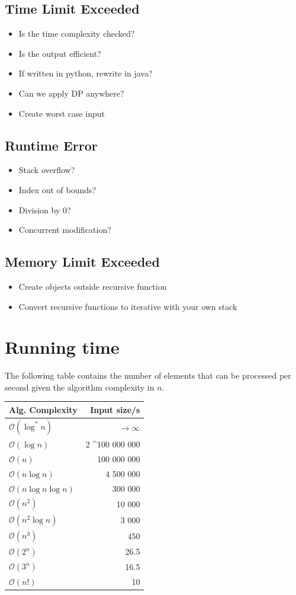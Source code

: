 \documentclass[8pt,a4paper,landscape,oneside]{amsart}
\newcommand{\bigO}{\mathcal{O}}
\begin{document}
\begin{multicols*}{3}
  \subsection{Time Limit Exceeded}
    \begin{itemize}
    \item Is the time complexity checked?
    \item Is the output efficient?
    \item If written in python, rewrite in java?
    \item Can we apply DP anywhere?
    \item Create worst case input
    \end{itemize}
  \subsection{Runtime Error}
    \begin{itemize}
    \item Stack overflow?
    \item Index out of bounds?
    \item Division by $0$?
    \item Concurrent modification?
    \end{itemize}
  \subsection{Memory Limit Exceeded}
    \begin{itemize}
    \item Create objects outside recursive function
    \item Convert recursive functions to iterative with your own stack
    \end{itemize}
        
        
\section{Running time}
The following table contains the number of elements that can be processed per second given the algorithm complexity in $n$.
\begin{center}
\begin{tabular}{lr}
Alg. Complexity & Input size/s \\ \hline
$\bigO(\log^*{n})$   & $\rightarrow \infty$ \\
$\bigO(\log{n})$     & 2 \textasciicircum 100 000 000 \\
$\bigO(n)$           & 100 000 000 \\
$\bigO(n\log{n})$   & 4 500 000 \\
$\bigO(n\log{n}\log{n})$ & 300 000 \\
$\bigO(n^2)$         & 10 000 \\
$\bigO(n^2\log{n})$ & 3 000 \\
$\bigO(n^3)$         & 450 \\
$\bigO(2^n)$         & 26.5 \\
$\bigO(3^n)$         & 16.5 \\
$\bigO(n!)$          & 10
\end{tabular}
\end{center}


\end{multicols*}
\end{document}
